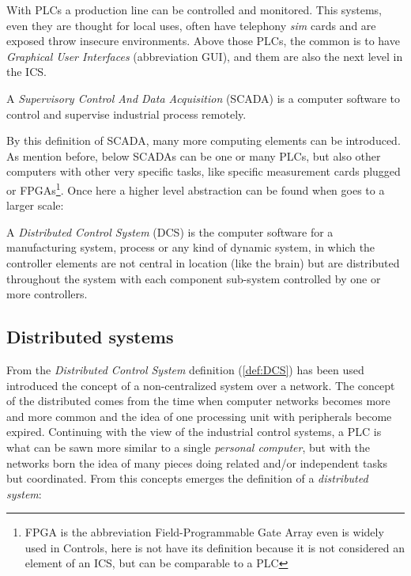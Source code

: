 \documentclass[10pt,a4paper,twoside]{llncs}
\begin{document}
With PLCs a production line can be controlled and monitored. This systems, even they are thought for local uses, often have telephony \emph{sim} cards and are exposed throw insecure environments. Above those PLCs, the common is to have \emph{Graphical User Interfaces} (abbreviation GUI), and them are also the next level in the ICS.

\begin{definition}\label{def:SCADA}
    A \emph{Supervisory Control And Data Acquisition} (SCADA) is a computer software to control and supervise industrial process remotely.
\end{definition}

By this definition of SCADA, many more computing elements can be introduced. As mention before, below SCADAs can be one or many PLCs, but also other computers with other very specific tasks, like specific measurement cards plugged or FPGAs\footnote{FPGA is the abbreviation Field-Programmable Gate Array even is widely used in Controls, here is not have its definition because it is not considered an element of an ICS, but can be comparable to a PLC}. Once here a higher level abstraction can be found when goes to a larger scale:

\begin{definition}\label{def:DCS}
    A \emph{Distributed Control System} (DCS) is the computer software for a manufacturing system, process or any kind of dynamic system, in which the controller elements are not central in location (like the brain) but are distributed throughout the system with each component sub-system controlled by one or more controllers.
\end{definition}

\subsection{Distributed systems}\label{sec:DistrSys}

From the \emph{Distributed Control System} definition (\ref{def:DCS}) has been used introduced the concept of a non-centralized system over a network. The concept of the distributed comes from the time when computer networks becomes more and more common and the idea of one processing unit with peripherals become expired. Continuing with the view of the industrial control systems, a PLC is what can be sawn more similar to a single \emph{personal computer}, but with the networks born the idea of many pieces doing related and/or independent tasks but coordinated. From this concepts emerges the definition of a \emph{distributed system}:
\end{document}
